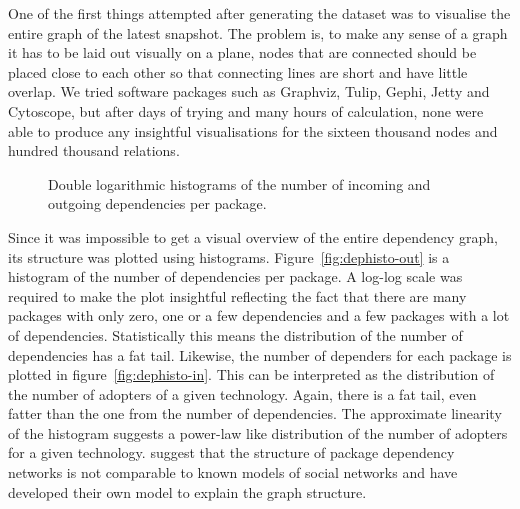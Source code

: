 \documentclass[smallextended,final]{svjour3}
\begin{document}
One of the first things attempted after generating the dataset was to visualise the entire graph of the latest snapshot. The problem is, to make any sense of a graph it has to be laid out visually on a plane, nodes that are connected should be placed close to each other so that connecting lines are short and have little overlap. We tried software packages such as Graphviz, Tulip, Gephi, Jetty and Cytoscope, but after days of trying and many hours of calculation, none were able to produce any insightful visualisations for the sixteen thousand nodes and hundred thousand relations.

\begin{figure}
\small\centering
{}
\caption{Double logarithmic histograms of the number of incoming and outgoing dependencies per package.}
\end{figure}

Since it was impossible to get a visual overview of the entire dependency graph, its structure was plotted using histograms. Figure~\ref{fig:dephisto-out} is a histogram of the number of dependencies per package. A log-log scale was required to make the plot insightful reflecting the fact that there are many packages with only zero, one or a few dependencies and a few packages with a lot of dependencies. Statistically this means the distribution of the number of dependencies has a fat tail. Likewise, the number of dependers for each package is plotted in figure~\ref{fig:dephisto-in}. This can be interpreted as the distribution of the number of adopters of a given technology. Again, there is a fat tail, even fatter than the one from the number of dependencies. The approximate linearity of the histogram suggests a power-law like distribution of the number of adopters for a given technology. \citet{zheng08} suggest that the structure of package dependency networks is not comparable to known models of social networks and have developed their own model to explain the graph structure.
\end{document}
